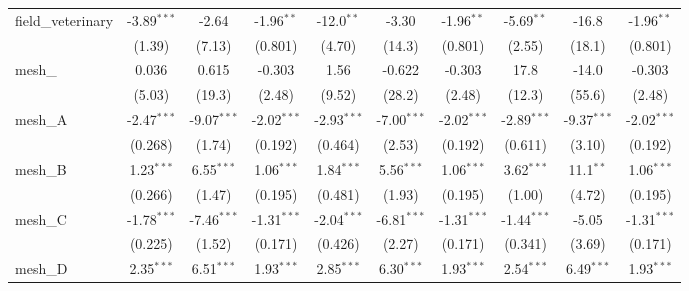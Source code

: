 \begin{tabular}{lccccccccc}
   field\_veterinary                                           & -3.89$^{***}$ & -2.64         & -1.96$^{**}$  & -12.0$^{**}$  & -3.30          & -1.96$^{**}$  & -5.69$^{**}$  & -16.8         & -1.96$^{**}$\\   
                                                               & (1.39)        & (7.13)        & (0.801)       & (4.70)        & (14.3)         & (0.801)       & (2.55)        & (18.1)        & (0.801)\\   
   mesh\_                                                      & 0.036         & 0.615         & -0.303        & 1.56          & -0.622         & -0.303        & 17.8          & -14.0         & -0.303\\   
                                                               & (5.03)        & (19.3)        & (2.48)        & (9.52)        & (28.2)         & (2.48)        & (12.3)        & (55.6)        & (2.48)\\   
   mesh\_A                                                     & -2.47$^{***}$ & -9.07$^{***}$ & -2.02$^{***}$ & -2.93$^{***}$ & -7.00$^{***}$  & -2.02$^{***}$ & -2.89$^{***}$ & -9.37$^{***}$ & -2.02$^{***}$\\   
                                                               & (0.268)       & (1.74)        & (0.192)       & (0.464)       & (2.53)         & (0.192)       & (0.611)       & (3.10)        & (0.192)\\   
   mesh\_B                                                     & 1.23$^{***}$  & 6.55$^{***}$  & 1.06$^{***}$  & 1.84$^{***}$  & 5.56$^{***}$   & 1.06$^{***}$  & 3.62$^{***}$  & 11.1$^{**}$   & 1.06$^{***}$\\   
                                                               & (0.266)       & (1.47)        & (0.195)       & (0.481)       & (1.93)         & (0.195)       & (1.00)        & (4.72)        & (0.195)\\   
   mesh\_C                                                     & -1.78$^{***}$ & -7.46$^{***}$ & -1.31$^{***}$ & -2.04$^{***}$ & -6.81$^{***}$  & -1.31$^{***}$ & -1.44$^{***}$ & -5.05         & -1.31$^{***}$\\   
                                                               & (0.225)       & (1.52)        & (0.171)       & (0.426)       & (2.27)         & (0.171)       & (0.341)       & (3.69)        & (0.171)\\   
   mesh\_D                                                     & 2.35$^{***}$  & 6.51$^{***}$  & 1.93$^{***}$  & 2.85$^{***}$  & 6.30$^{***}$   & 1.93$^{***}$  & 2.54$^{***}$  & 6.49$^{***}$  & 1.93$^{***}$\\   

\end{tabular}
